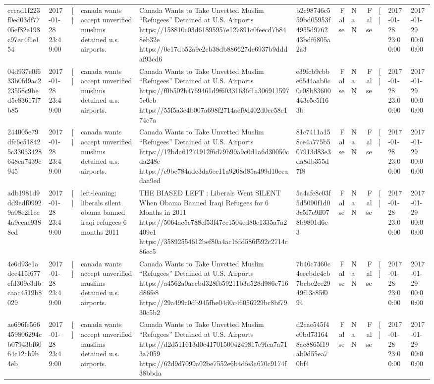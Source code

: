 \begin{tabular}{llllllrlrlll}
cccad1f223f0ed03df7705ef82e198c97ec4f1e154 & 2017-01-28 23:49:00 & [] & canada wants accept unverified muslims detained u.s. airports. & Canada Wants to Take Unvetted Muslim “Refugees” Detained at U.S. Airports https://158810c03d61895957e127891c0feecd7b848eb32e https://0c17db52a9e2cb38db886627de6937b9dddaf93cd6 & b2c98746c559bd05953f4955d976243bdf6805a2a3 & False & NaN & False & [] & 2017-01-28 23:00:00 & 2017-01-29 00:00:00 \\
04d937e0f633b0fd9ac223558c9bed5c83617f7b85 & 2017-01-28 23:49:00 & [] & canada wants accept unverified muslims detained u.s. airports. & Canada Wants to Take Unvetted Muslim “Refugees” Detained at U.S. Airports https://f0b502b4769461d9f60331636f1a3069115975e0cb https://55f5a3e4b007a698f2714aef9d402d0cc58e174c7a & e39fcb9cbbe6544aab0c0c08b83600443c5c5f163b & False & NaN & False & [] & 2017-01-28 23:00:00 & 2017-01-29 00:00:00 \\
244005e79dfc6c518425c33033428648ea7439c945 & 2017-01-28 23:49:00 & [] & canada wants accept unverified muslims detained u.s. airports. & Canada Wants to Take Unvetted Muslim “Refugees” Detained at U.S. Airports https://12bda61271912f6d79b99a9c0d1a6d30050cda248c https://c9bc784adc3da6ee11a9208d85a499d10eeadaa9ed & 81c7411a158ce4a775b507913d83e3da8db355d7f8 & False & NaN & False & [] & 2017-01-28 23:00:00 & 2017-01-29 00:00:00 \\
adb1981d9dd9edf09929a08e2f1ce4a9ceac9388cd & 2017-01-28 23:49:00 & [] & left-leaning: liberals silent obama banned iraqi refugees 6 months 2011 & THE BIASED LEFT : Liberals Went SILENT When Obama Banned Iraqi Refugees for 6 Months in 2011 https://5064ac5c788cf53f47ec1504ed80e1335a7a2409e1 https://35892554612bef80a4ac1fdd586f592c2714c86ec5 & 5a4afe8c03f5d5090f1d03c5f7e9ff078b9801d6e3 & False & NaN & False & [] & 2017-01-28 23:00:00 & 2017-01-29 00:00:00 \\
4e6d93e1adee415f677efd309e3dbcaac4519b8029 & 2017-01-28 23:49:00 & [] & canada wants accept unverified muslims detained u.s. airports. & Canada Wants to Take Unvetted Muslim “Refugees” Detained at U.S. Airports https://a4562a0accbd328fb59211b3a528d986c716d86fe8 https://29a499c0db945fbe04d0c46056929bc8bf7930c5b2 & 7b46c7460c4eecbdc4cb7bcbe2ce2949f13c85f094 & False & NaN & False & [] & 2017-01-28 23:00:00 & 2017-01-29 00:00:00 \\
ae696fe566459806294cb07943bf6064c12cb9b4eb & 2017-01-28 23:49:00 & [] & canada wants accept unverified muslims detained u.s. airports. & Canada Wants to Take Unvetted Muslim “Refugees” Detained at U.S. Airports https://d2d511613d0c417015004249817e9fca7a713a7059 https://62d9d7099a02be7552e6b4dfe3a670c9174f38bbda & d2cae545f4e0bd731648ac8865f19ab0d55ea70bf4 & False & NaN & False & [] & 2017-01-28 23:00:00 & 2017-01-29 00:00:00 \\

\end{tabular}
